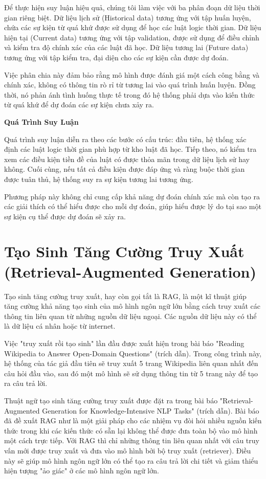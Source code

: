 Để thực hiện suy luận hiệu quả, chúng tôi làm việc với ba phân đoạn dữ liệu thời gian riêng biệt. Dữ liệu lịch sử (Historical data) tương ứng với tập huấn luyện, chứa các sự kiện từ quá khứ được sử dụng để học các luật logic thời gian. Dữ liệu hiện tại (Current data) tương ứng với tập validation, được sử dụng để điều chỉnh và kiểm tra độ chính xác của các luật đã học. Dữ liệu tương lai (Future data) tương ứng với tập kiểm tra, đại diện cho các sự kiện cần được dự đoán.

Việc phân chia này đảm bảo rằng mô hình được đánh giá một cách công bằng và chính xác, không có thông tin rò rỉ từ tương lai vào quá trình huấn luyện. Đồng thời, nó phản ánh tình huống thực tế trong đó hệ thống phải dựa vào kiến thức từ quá khứ để dự đoán các sự kiện chưa xảy ra.

\textbf{Quá Trình Suy Luận}

Quá trình suy luận diễn ra theo các bước có cấu trúc: đầu tiên, hệ thống xác định các luật logic thời gian phù hợp từ kho luật đã học. Tiếp theo, nó kiểm tra xem các điều kiện tiền đề của luật có được thỏa mãn trong dữ liệu lịch sử hay không. Cuối cùng, nếu tất cả điều kiện được đáp ứng và ràng buộc thời gian được tuân thủ, hệ thống suy ra sự kiện tương lai tương ứng.

Phương pháp này không chỉ cung cấp khả năng dự đoán chính xác mà còn tạo ra các giải thích có thể hiểu được cho mỗi dự đoán, giúp hiểu được lý do tại sao một sự kiện cụ thể được dự đoán sẽ xảy ra.


\section{Tạo Sinh Tăng Cường Truy Xuất (Retrieval-Augmented Generation)}

Tạo sinh tăng cường truy xuất, hay còn gọi tắt là RAG, là một kĩ thuật giúp tăng cường khả năng tạo sinh của mô hình ngôn ngữ lớn bằng cách truy xuất các thông tin liên quan từ những nguồn dữ liệu ngoại. Các nguồn dữ liệu này có thể là dữ liệu cá nhân hoặc từ internet.

Việc "truy xuất rồi tạo sinh" lần đầu được xuất hiện trong bài báo "Reading Wikipedia to Answer Open-Domain Questions" (trích dẫn). Trong công trình này, hệ thống của tác giả đầu tiên sẽ truy xuất 5 trang Wikipedia liên quan nhất đến câu hỏi đầu vào, sau đó một mô hình sẽ sử dụng thông tin từ 5 trang này để tạo ra câu trả lời.

Thuật ngữ tạo sinh tăng cường truy xuất được đặt ra trong bài báo "Retrieval-Augmented Generation for Knowledge-Intensive NLP Tasks" (trích dẫn). Bài báo đã đề xuất RAG như là một giải pháp cho các nhiệm vụ đòi hỏi nhiều nguồn kiến thức trong khi các kiến thức có sẵn lại không thể được đưa toàn bộ vào mô hình một cách trực tiếp. Với RAG thì chỉ những thông tin liên quan nhất với câu truy vấn  mới được truy xuất và đưa vào mô hình bởi bộ truy xuất (retriever). Điều này sẽ giúp mô hình ngôn ngữ lớn có thể tạo ra câu trả lời chi tiết và giảm thiểu hiện tượng "ảo giác" ở các mô hình ngôn ngữ lớn.

